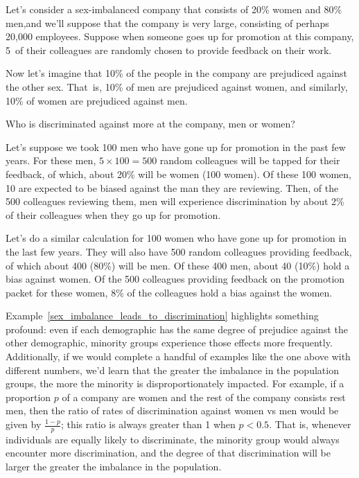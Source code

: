 \begin{examplewrap}
\begin{nexample}{Let's consider a sex-imbalanced
    company that consists of 20\% women
    and 80\% men,\footnotemark and we'll suppose that the
    company is very large, consisting of perhaps
    20,000 employees.
    Suppose when someone goes up for promotion at this
    company, 5~of their colleagues are randomly chosen
    to provide feedback on their work.
    \exspace{}

    Now let's imagine that 10\% of the people in the
    company are prejudiced against the other sex.
    That~is, 10\% of men are prejudiced against women,
    and similarly, 10\% of women are prejudiced against men.
    \exspace{}
    
    Who is discriminated against more at the company,
    men or women?}
  \label{sex_imbalance_leads_to_discrimination}%
  Let's suppose we took 100 men who have gone up for
  promotion in the past few years.
  For these men, $5 \times 100 = 500$ random colleagues
  will be tapped for their feedback, of which,
  about 20\% will be women (100 women).
  Of these 100 women, 10 are expected to be biased
  against the man they are reviewing.
  Then, of the 500 colleagues reviewing them,
  men will experience
  discrimination by about 2\% of their colleagues when
  they go up for promotion.

  Let's do a similar calculation for 100 women
  who have gone up for promotion in the last few years.
  They will also have 500 random colleagues providing
  feedback, of which about 400 (80\%) will be men.
  Of these 400 men, about 40 (10\%) hold a bias against
  women.
  Of the 500 colleagues providing feedback on the
  promotion packet for these women, 8\% of the
  colleagues hold a bias against the women.
\end{nexample}
\end{examplewrap}

Example~\ref{sex_imbalance_leads_to_discrimination}
highlights something profound:
even if each demographic has the same degree of prejudice
against the other demographic, minority groups
experience those effects more frequently.
Additionally, if we would complete a handful of examples
like the one above with different numbers,
we'd learn that the greater the imbalance
in the population groups, the more the minority
is disproportionately impacted.
For example, if a proportion $p$ of a company are
women and the rest of the company consists rest men,
then the ratio of rates of discrimination against women
vs men would be given by $\frac{1 - p}{p}$;
this ratio is always greater than 1 when $p < 0.5$.
That is, whenever individuals are equally likely to
discriminate, the minority group would always encounter
more discrimination, and the degree of that discrimination
will be larger the greater the imbalance in the population.

